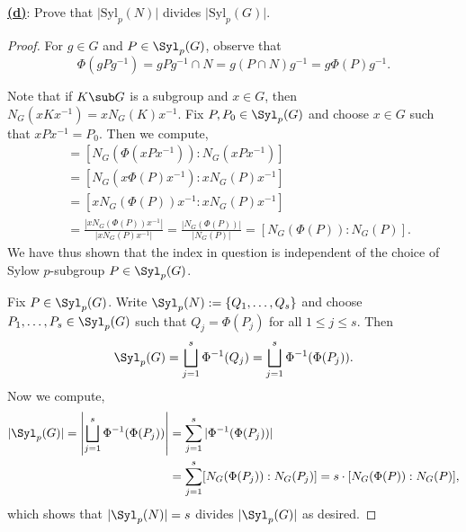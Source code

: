 \documentclass[12pt]{article}
\begin{document}
\begin{homeworkProblem}
  \underline{\textbf{(d)}}: Prove that $\lvert \mathrm{Syl}_p(N)\rvert$ divides $\lvert \mathrm{Syl}_p(G)\rvert$.  
  
  \begin{proof}
 For $ g\in G $ and $ P\in \Syl_{p}(G) $, observe that
\[
  \Phi(gPg^{-1}) = gPg^{-1}\cap N = g(P\cap N)g^{-1} = g \Phi(P) g^{-1}.
\]



    Note that if $ K\sub G $ is a subgroup and $ x\in G $, then $ N_{G}(xKx^{-1}) = xN_{G}(K)x^{-1} $. 
    Fix $ P,P_{0}\in \Syl_{p}(G) $ and choose $ x\in G $ such that $ xPx^{-1}= P_{0} $. Then we compute,
    \begin{align*}
      [N_{G}(\Phi(P_{0})): N_{G}(P_{0})] &= [N_{G}( \Phi(xPx^{-1})): N_{G}(xPx^{-1})] \\
      &= [N_{G}( x\Phi(P)x^{-1}): xN_{G}(P)x^{-1}] \\
      &= [xN_{G}( \Phi(P))x^{-1}: xN_{G}(P)x^{-1}] \\
      &= \frac{|xN_{G}(\Phi(P))x^{-1}|}{|xN_{G}(P)x^{-1}|} = \frac{|N_{G}(\Phi(P))|}{|N_{G}(P)|} = [N_{G}(\Phi(P)): N_{G}(P)].
    \end{align*}
    We have thus shown that the index in question is independent of the choice of Sylow $ p $-subgroup $ P\in \Syl_{p}(G) $.

    Fix $ P\in \Syl_{p}(G) $. Write $ \Syl_{p}(N):=\{Q_{1},\ldots, Q_{s}\} $ and choose $ P_{1},\ldots, P_{s}\in \Syl_{p}(G) $ such that $ Q_{j} = \Phi(P_{j}) $ for all $1\leq j \leq s$.
    Then 
    \[\Syl_{p}(G) = \bigsqcup_{j=1}^{s} \Phi^{-1}(Q_{j}) = \bigsqcup_{j=1}^{s} \Phi^{-1}(\Phi(P_{j})).\]
    Now we compute,
    \begin{align*}
      |\Syl_{p}(G)| = \left|\bigsqcup_{j=1}^{s} \Phi^{-1}(\Phi(P_{j}))\right| &= \sum_{j=1}^{s}| \Phi^{-1}(\Phi(P_{j}))|\\
      &= \sum_{j=1}^{s} [N_{G}(\Phi(P_{j})): N_{G}(P_{j})] = s\cdot [N_{G}(\Phi(P)): N_{G}(P)],
    \end{align*}
    which shows that $ |\Syl_{p}(N)|=s$ divides $|\Syl_{p}(G)| $ as desired.
  \end{proof}

\end{homeworkProblem}
\end{document}
